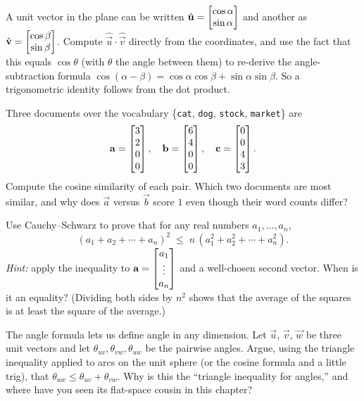 \begin{exercise}
A unit vector in the plane can be written
$\hat{\mathbf{u}}=\begin{bmatrix}\cos\alpha\\\sin\alpha\end{bmatrix}$ and another as
$\hat{\mathbf{v}}=\begin{bmatrix}\cos\beta\\\sin\beta\end{bmatrix}$. Compute
$\hat{\vec u}\cdot\hat{\vec v}$ directly from the coordinates, and use the fact that
this equals $\cos\theta$ (with $\theta$ the angle between them) to re-derive the
angle-subtraction formula
$\cos(\alpha-\beta)=\cos\alpha\cos\beta+\sin\alpha\sin\beta$. So a trigonometric
identity follows from the dot product.
\end{exercise}

\begin{exercise}
Three documents over the vocabulary \{\texttt{cat}, \texttt{dog}, \texttt{stock},
\texttt{market}\} are
\[
  \mathbf{a}=\begin{bmatrix}3\\2\\0\\0\end{bmatrix},\quad
  \mathbf{b}=\begin{bmatrix}6\\4\\0\\0\end{bmatrix},\quad
  \mathbf{c}=\begin{bmatrix}0\\0\\4\\3\end{bmatrix}.
\]
Compute the cosine similarity of each pair. Which two documents are most similar, and
why does $\vec a$ versus $\vec b$ score $1$ even though their word counts differ?
\end{exercise}

\begin{exercise}[Challenge]
Use Cauchy--Schwarz to prove that for any real numbers $a_1,\dots,a_n$,
\[
  (a_1 + a_2 + \cdots + a_n)^2 \;\le\; n\,(a_1^2 + a_2^2 + \cdots + a_n^2).
\]
\emph{Hint:} apply the inequality to $\mathbf{a} = \begin{bmatrix}a_1\\\vdots\\a_n\end{bmatrix}$ and a
well-chosen second vector. When is it an equality? (Dividing both sides by $n^2$ shows that the average of the squares is at least the
square of the average.)
\end{exercise}

\begin{exercise}[Challenge]
The angle formula lets us define angle in any dimension. Let $\vec u$, $\vec v$,
$\vec w$ be three unit vectors and let
$\theta_{uv},\theta_{vw},\theta_{uw}$ be the pairwise angles. Argue, using the
triangle inequality applied to arcs on the unit sphere (or the cosine formula and a
little trig), that $\theta_{uw}\le\theta_{uv}+\theta_{vw}$. Why is this the
``triangle inequality for angles,'' and where have you seen its flat-space cousin in
this chapter?
\end{exercise}
